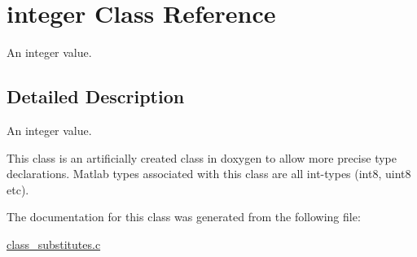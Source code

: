 \hypertarget{classinteger}{\section{integer Class Reference}
\label{classinteger}
}


An integer value.  




\subsection{Detailed Description}
An integer value. 

This class is an artificially created class in doxygen to allow more precise type declarations. Matlab types associated with this class are all int-\/types (int8, uint8 etc). 

The documentation for this class was generated from the following file\-:\begin{DoxyCompactItemize}
\item 
\hyperlink{class__substitutes_8c}{class\-\_\-substitutes.\-c}\end{DoxyCompactItemize}
